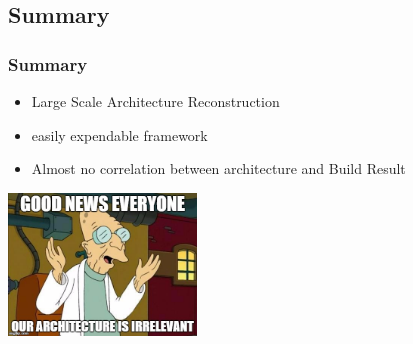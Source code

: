 \documentclass{beamer}
\begin{document}
\subsection{Summary}
\begin{frame}
\frametitle{Summary}

\begin{itemize}
	\item Large Scale Architecture Reconstruction
	\item easily expendable framework
	\item Almost no correlation between architecture and Build Result
\end{itemize}
\pause
\begin{center}
	\includegraphics[width=5cm]{assets/professor.jpg}
\end{center}

\end{frame}
 
\end{document}
